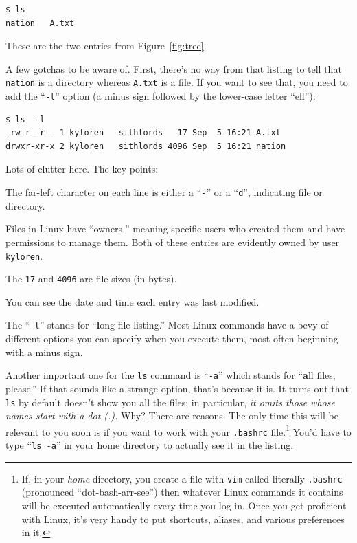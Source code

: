 \begin{enumerate}
\begin{Verbatim}[fontsize=\small]
$ ls
nation   A.txt
\end{Verbatim}

These are the two entries from Figure~\ref{fig:tree}.

A few gotchas to be aware of. First, there's no way from that listing to
tell that \texttt{nation} is a directory whereas \texttt{A.txt} is a file. If
you want to see that, you need to add the ``\texttt{-l}'' option (a minus sign
followed by the lower-case letter ``ell''):

\begin{Verbatim}[fontsize=\small]
$ ls  -l
-rw-r--r-- 1 kyloren   sithlords   17 Sep  5 16:21 A.txt
drwxr-xr-x 2 kyloren   sithlords 4096 Sep  5 16:21 nation
\end{Verbatim}

Lots of clutter here. The key points:

\begin{compactitem}[-]
\item The far-left character on each line is either a ``\texttt{-}'' or a
``\texttt{d}'', indicating file or directory.
\item Files in Linux have ``owners,'' meaning specific users who created them
and have permissions to manage them. Both of these entries are evidently owned
by user \texttt{kyloren}.
\item The \texttt{17} and \texttt{4096} are file sizes (in bytes).
\item You can see the date and time each entry was last modified.
\end{compactitem}

The ``\texttt{-l}'' stands for ``\textbf{l}ong file listing.'' Most Linux
commands have a bevy of different options you can specify when you execute
them, most often beginning with a minus sign.

Another important one for the \texttt{ls} command is ``\texttt{-a}'' which
stands for ``\textbf{a}ll files, please.'' If that sounds like a strange
option, that's because it is. It turns out that \texttt{ls} by default doesn't
show you all the files; in particular, \textit{it omits those whose names start
with a dot (.).} Why? There are reasons. The only time this will be relevant to
you soon is if you want to work with your \texttt{.bashrc} file.\footnote{If,
in your \textit{home} directory, you create a file with \texttt{vim} called
literally \texttt{.bashrc} (pronounced ``dot-bash-arr-see'') then whatever
Linux commands it contains will be executed automatically every time you log
in. Once you get proficient with Linux, it's very handy to put shortcuts,
aliases, and various preferences in it.} You'd have to type ``\texttt{ls -a}''
in your home directory to actually see it in the listing.



\end{enumerate}
